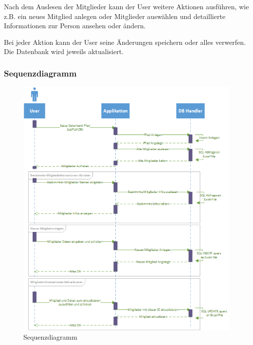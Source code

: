 \documentclass{article}
\begin{document}
Nach dem Auslesen der Mitglieder kann der User weitere Aktionen ausführen, wie z.B. ein neues Mitglied anlegen oder Mitglieder auswählen und detaillierte Informationen zur Person ansehen oder ändern.

Bei jeder Aktion kann der User seine Änderungen speichern oder alles verwerfen. Die Datenbank wird jeweils aktualisiert.

\newpage


\subsubsection{Sequenzdiagramm}
\begin{figure}[h]
	\centering
	\includegraphics[width=0.8 \textwidth]{Sequenz-Diagramm_v1}
	\caption{Sequenzdiagramm}
\end{figure}
\end{document}
